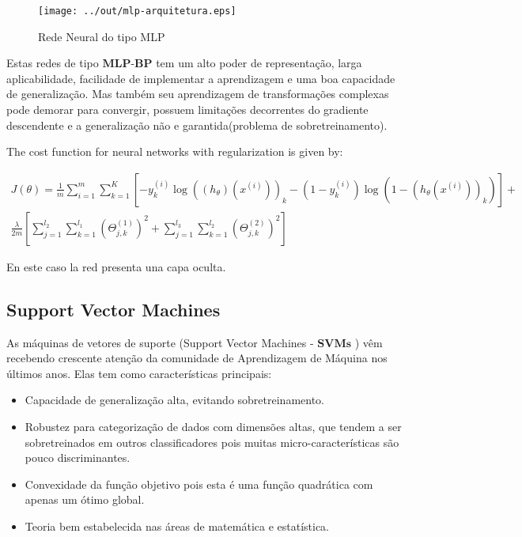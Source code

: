 \documentclass[12pt]{article}
\begin{document}
\begin{figure}[h]
\centering
\texttt{[image: ../out/mlp-arquitetura.eps]}
\caption{Rede Neural do tipo MLP}
\label{fig:mlp}
\end{figure} 

Estas redes de tipo $\textbf{MLP-BP}$ tem um alto poder de representação, larga aplicabilidade, facilidade de implementar a aprendizagem e uma boa capacidade de generalização. Mas também seu aprendizagem de transformações complexas pode demorar para convergir, possuem limitações decorrentes do gradiente descendente e a generalização não e garantida(problema de sobretreinamento).

The cost function for neural networks with regularization is given by:

\begin{equation*}
\begin{split}
J(\theta) = \frac{1}{m}\sum_{i=1}^{m}\sum_{k=1}^{K} [-y_k^{(i)}\log((h_{\theta})(x^{(i)}))_k -
(1-y_k^{(i)})\log(1-(h_{\theta}(x^{(i)}))_k) ]
+ \\ \frac{\lambda}{2m}[\sum_{j=1}^{l_2}\sum_{k=1}^{l_1}(\Theta_{j,k}^{(1)})^{2} + \sum_{j=1}^{l_3}\sum_{k=1}^{l_2}(\Theta_{j,k}^{(2)})^{2}] 
\end{split}
\end{equation*}

En este caso la red presenta una capa oculta.


\subsection{Support Vector Machines}

As máquinas de vetores de suporte (Support Vector Machines - $\textbf{SVMs}$ ) vêm recebendo crescente atenção da comunidade de Aprendizagem de Máquina nos últimos anos. Elas tem como características principais:
\begin{itemize}
    \item Capacidade de generalização alta, evitando sobretreinamento.
    \item Robustez para categorização de dados com dimensões altas, que tendem a ser sobretreinados em outros classificadores pois muitas micro-características são pouco discriminantes.
    \item Convexidade da função objetivo pois esta é uma função quadrática com apenas um ótimo global. 
    \item Teoria bem estabelecida nas áreas de matemática e estatística.
\end{itemize}
\end{document}

